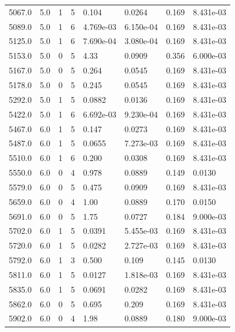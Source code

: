 \documentclass[preview]{standalone}
\begin{document}
{{{{{\begin{tabular}{L{1.2cm}C{1.2cm} C{0.3cm}C{0.5cm} C{1.4cm}C{1.4cm} C{1.4cm}C{1.4cm}}
  5067.0  &   5.0  & 1     &  5 &  0.104  & 0.0264  & 0.169 &  8.431e-03   \\ 
  5089.0  &   5.0  & 1     &  6 &  4.769e-03  & 6.150e-04  & 0.169 &  8.431e-03   \\ 
  5125.0  &   5.0  & 1     &  6 &  7.690e-04  & 3.080e-04  & 0.169 &  8.431e-03   \\ 
  5153.0  &   5.0  & 0     &  5 &  4.33  & 0.0909  & 0.356 &  6.000e-03   \\ 
  5167.0  &   5.0  & 0     &  5 &  0.264  & 0.0545  & 0.169 &  8.431e-03   \\ 
  5178.0  &   5.0  & 0     &  5 &  0.245  & 0.0545  & 0.169 &  8.431e-03   \\ 
  5292.0  &   5.0  & 1     &  5 &  0.0882  & 0.0136  & 0.169 &  8.431e-03   \\ 
  5422.0  &   5.0  & 1     &  6 &  6.692e-03  & 9.230e-04  & 0.169 &  8.431e-03   \\ 
  5467.0  &   6.0  & 1     &  5 &  0.147  & 0.0273  & 0.169 &  8.431e-03   \\ 
  5487.0  &   6.0  & 1     &  5 &  0.0655  & 7.273e-03  & 0.169 &  8.431e-03   \\ 
  5510.0  &   6.0  & 1     &  6 &  0.200  & 0.0308  & 0.169 &  8.431e-03   \\ 
  5550.0  &   6.0  & 0     &  4 &  0.978  & 0.0889  & 0.149 &  0.0130   \\ 
  5579.0  &   6.0  & 0     &  5 &  0.475  & 0.0909  & 0.169 &  8.431e-03   \\ 
  5659.0  &   6.0  & 0     &  4 &  1.00  & 0.0889  & 0.170 &  0.0150   \\ 
  5691.0  &   6.0  & 0     &  5 &  1.75  & 0.0727  & 0.184 &  9.000e-03   \\ 
  5702.0  &   6.0  & 1     &  5 &  0.0391  & 5.455e-03  & 0.169 &  8.431e-03   \\ 
  5720.0  &   6.0  & 1     &  5 &  0.0282  & 2.727e-03  & 0.169 &  8.431e-03   \\ 
  5792.0  &   6.0  & 1     &  3 &  0.500  & 0.109  & 0.145 &  0.0130   \\ 
  5811.0  &   6.0  & 1     &  5 &  0.0127  & 1.818e-03  & 0.169 &  8.431e-03   \\ 
  5835.0  &   6.0  & 1     &  5 &  0.0691  & 0.0282  & 0.169 &  8.431e-03   \\ 
  5862.0  &   6.0  & 0     &  5 &  0.695  & 0.209  & 0.169 &  8.431e-03   \\ 
  5902.0  &   6.0  & 0     &  4 &  1.98  & 0.0889  & 0.180 &  9.000e-03   \\ 

\end{tabular}}}}}}
\end{document}
